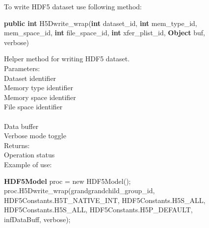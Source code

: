 \documentclass[11p]{article}
\begin{document}
To write HDF5 dataset use following method:

\begin{kod}
{\bf public int} H5Dwrite\_wrap({\bf int} dataset\_id, {\bf int}
mem\_type\_id,\\
\hspace*{0.5cm}{\bf int} mem\_space\_id, {\bf int} file\_space\_id, {\bf int}
xfer\_plist\_id, {\bf Object} buf,\\
\hspace*{0.5cm}{\bf boolean} verbose)
\end{kod}
Helper method for writing HDF5 dataset.\\
Parameters:\\
	\hspace*{0.5cm}{\bf dataset\_id} Dataset identifier\\
    \hspace*{0.5cm}{\bf mem\_type\_id} Memory type identifier\\
    \hspace*{0.5cm}{\bf mem\_space\_id} Memory space identifier\\
    \hspace*{0.5cm}{\bf file\_space\_id} File space identifier\\
    \hspace*{0.5cm}{\bf xfer\_plist\_id} \\
    \hspace*{0.5cm}{\bf buf} Data buffer\\
    \hspace*{0.5cm}{\bf verbose} Verbose mode toggle\\
Returns:\\
    \hspace*{0.5cm}Operation status\\

Example of use:
\begin{kod}
{\bf HDF5Model} proc = new HDF5Model();\\
proc.H5Dwrite\_wrap(grandgrandchild\_group\_id,\\
\hspace*{0.5cm}HDF5Constants.H5T\_NATIVE\_INT, HDF5Constants.H5S\_ALL,\\
\hspace*{0.5cm}HDF5Constants.H5S\_ALL, HDF5Constants.H5P\_DEFAULT,\\
\hspace*{0.5cm}infDataBuff, verbose);\\
\end{kod}
\end{document}
